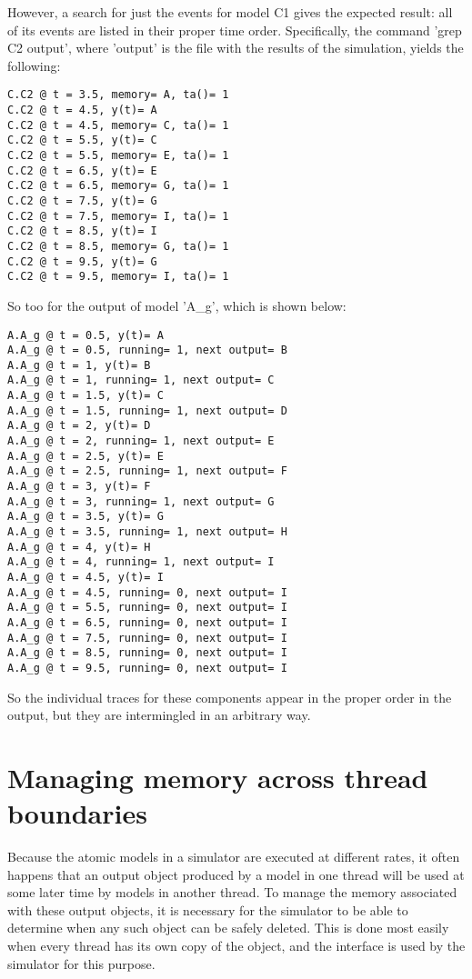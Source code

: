 However, a search for just the events for model C1 gives the expected result: all of its events are listed in their proper time order. Specifically, the command 'grep C2 output', where 'output' is the file with the results of the simulation, yields the following:
\begin{verbatim}
C.C2 @ t = 3.5, memory= A, ta()= 1
C.C2 @ t = 4.5, y(t)= A
C.C2 @ t = 4.5, memory= C, ta()= 1
C.C2 @ t = 5.5, y(t)= C
C.C2 @ t = 5.5, memory= E, ta()= 1
C.C2 @ t = 6.5, y(t)= E
C.C2 @ t = 6.5, memory= G, ta()= 1
C.C2 @ t = 7.5, y(t)= G
C.C2 @ t = 7.5, memory= I, ta()= 1
C.C2 @ t = 8.5, y(t)= I
C.C2 @ t = 8.5, memory= G, ta()= 1
C.C2 @ t = 9.5, y(t)= G
C.C2 @ t = 9.5, memory= I, ta()= 1
\end{verbatim}
So too for the output of model 'A\_g', which is shown below:
\begin{verbatim}
A.A_g @ t = 0.5, y(t)= A
A.A_g @ t = 0.5, running= 1, next output= B
A.A_g @ t = 1, y(t)= B
A.A_g @ t = 1, running= 1, next output= C
A.A_g @ t = 1.5, y(t)= C
A.A_g @ t = 1.5, running= 1, next output= D
A.A_g @ t = 2, y(t)= D
A.A_g @ t = 2, running= 1, next output= E
A.A_g @ t = 2.5, y(t)= E
A.A_g @ t = 2.5, running= 1, next output= F
A.A_g @ t = 3, y(t)= F
A.A_g @ t = 3, running= 1, next output= G
A.A_g @ t = 3.5, y(t)= G
A.A_g @ t = 3.5, running= 1, next output= H
A.A_g @ t = 4, y(t)= H
A.A_g @ t = 4, running= 1, next output= I
A.A_g @ t = 4.5, y(t)= I
A.A_g @ t = 4.5, running= 0, next output= I
A.A_g @ t = 5.5, running= 0, next output= I
A.A_g @ t = 6.5, running= 0, next output= I
A.A_g @ t = 7.5, running= 0, next output= I
A.A_g @ t = 8.5, running= 0, next output= I
A.A_g @ t = 9.5, running= 0, next output= I
\end{verbatim}
So the individual traces for these components appear in the proper order in the output, but they are intermingled in an arbitrary way. 

\section{Managing memory across thread boundaries}
Because the atomic models in a simulator are executed at different rates, it often happens that an output object produced by a model in one thread will be used at some later time by models in another thread. To manage the memory associated with these output objects, it is necessary for the simulator to be able to determine when any such object can be safely deleted. This is done most easily when every thread has its own copy of the object, and the  interface is used by the simulator for this purpose.

